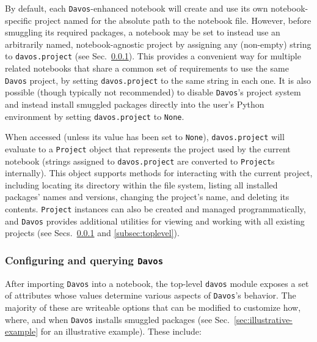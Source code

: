 \documentclass[preprint,12pt,a4paper]{elsarticle}
\begin{document}
By default, each \texttt{Davos}-enhanced notebook will create and use its own notebook-specific project named for the absolute path to the notebook file.
However, before smuggling its required packages, a notebook may be set to instead use an arbitrarily named, notebook-agnostic project by assigning any (non-empty) string to \texttt{davos.project} (see Sec.~\ref{subsec:config}).
This provides a convenient way for multiple related notebooks that share a common set of requirements to use the same \texttt{Davos} project, by setting \texttt{davos.project} to the same string in each one.
It is also possible (though typically not recommended) to disable \texttt{Davos}'s project system and instead install smuggled packages directly into the user's Python environment by setting \texttt{davos.project} to \texttt{None}.

When accessed (unless its value has been set to \texttt{None}), \texttt{davos.project} will evaluate to a \texttt{Project} object that represents the project used by the current notebook (strings assigned to \texttt{davos.project} are converted to \texttt{Project}s internally). This object supports methods for interacting with the current project, including locating its directory within the file system, listing all installed packages' names and versions, changing the project's name, and deleting its contents.
\texttt{Project} instances can also be created and managed programmatically, and \texttt{Davos} provides additional utilities for viewing and working with all existing projects (see Secs.~\ref{subsec:config} and \ref{subsec:toplevel}).


\subsubsection{Configuring and querying \texttt{Davos}}\label{subsec:config}

After importing \texttt{Davos} into a notebook, the top-level \texttt{davos} module exposes a set of attributes whose values determine various aspects of \texttt{Davos}'s behavior.
The majority of these are writeable options that can be modified to customize how, where, and when \texttt{Davos} installs smuggled packages (see Sec.~\ref{sec:illustrative-example} for an illustrative example).
These include:
\end{document}

